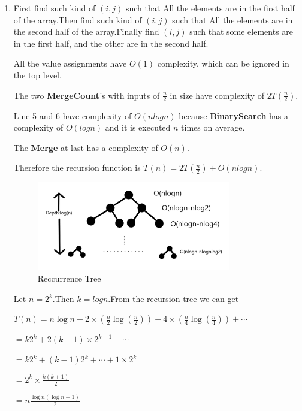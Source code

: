 \documentclass[12pt,a4paper]{article}
\makeatletter
\newtheorem*{solution}{Solution}
\theoremstyle{definition}
\renewenvironment{solution}[1][Solution] {\par\pushQED{\qed}\normalfont\topsep6\p@\@plus6\p@\relax\trivlist\item[\hskip\labelsep\bfseries#1\@addpunct{.}]\ignorespaces}{\popQED\endtrivlist\@endpefalse} \makeatother
\makeatother
\begin{document}
\begin{enumerate}
\begin{solution}
    	First find such kind of $(i,j)$ such that All the elements are in the first half of the array.Then find such kind of $(i,j)$ such that All the elements are in the second half of the array.Finally find $(i,j)$ such that some elements are in the first half, and the other are in the second half.
    	
    	All the value assignments have $O(1)$ complexity, which can be ignored in the top level.
    	
    	The two \textbf{MergeCount}'s with inputs of $\frac{n}{2}$ in size have complexity of $2T(\frac{n}{2})$.
    	
    	Line 5 and 6 have complexity of $O(nlogn)$ because \textbf{BinarySearch} has a complexity of $O(logn)$ and it is executed $n$ times on average.
    	
    	The \textbf{Merge} at last has a complexity of $O(n)$.
    	
    	Therefore the recursion function is $T(n)=2T(\frac{n}{2})+O(nlogn)$. \\
    	
    	\begin{figure}[htbp]
    		\centering
    		\includegraphics[width=0.8\textwidth]{test.png}
    		\caption{Reccurrence Tree}\label{Recurrence}
    	\end{figure}
    
    	Let $n=2^k$.Then $k=logn$.From the recursion tree we can get
    	
    	 $T(n)=n\log n+2\times(\frac{n}{2}\log(\frac{n}{2}))+4\times(\frac{n}{4}\log(\frac{n}{4}))+\cdots$
    	
    	$=k2^k+2(k-1)\times2^{k-1}+\cdots$
    	
    	$=k2^k+(k-1)2^k+\cdots+1\times2^k$
    	
    	$=2^k\times\frac{k(k+1)}{2}$
    	
    	$=n\frac{\log n(\log n+1)}{2}$
    	

\end{solution}
\end{enumerate}
\end{document}
